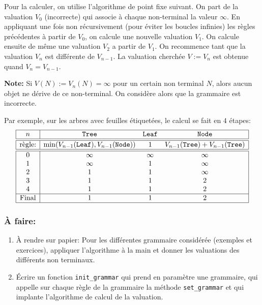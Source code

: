 \documentclass[11pt]{article}
\newcounter{asuivre}
\newenvironment{asks}{\begin{enumerate}\setcounter{enumi}{\theasuivre}}%
                       {\setcounter{asuivre}{\theenumi}\end{enumerate}}
\begin{document}
Pour la calculer, on utilise l'algorithme de point fixe suivant. On part de la
valuation $V_0$ (incorrecte) qui associe à chaque non-terminal la valeur
$\infty$. En appliquant une fois non récursivement (pour éviter les boucles
infinies) les règles précédentes à partir de $V_0$, on calcule une nouvelle
valuation $V_1$.  On calcule ensuite de même une valuation $V_2$ a partir de
$V_1$. On recommence tant que la valuation $V_n$ est différente de
$V_{n-1}$. La valuation cherchée $V := V_n$ est obtenue quand $V_n=V_{n-1}$.
\bigskip

\noindent\textbf{Note:} Si $V(N) := V_n(N) = \infty$ pour un certain non terminal
$N$, alors aucun objet ne dérive de ce non-terminal. On considère alors que la
grammaire est incorrecte.  \bigskip

Par exemple, sur les arbres avec feuilles étiquetées, le calcul se fait en $4$ étapes:
$$\begin{array}{|c|ccc|}
\hline
  n     &  \texttt{Tree}  &  \texttt{Leaf}  &  \texttt{Node} \\
\hline\hline
  \text{règle:} & \min(V_{n-1}(\texttt{Leaf}),V_{n-1}(\texttt{Node}))
               & 1
               & V_{n-1}(\texttt{Tree}) + V_{n-1}(\texttt{Tree}) \\
\hline\hline
  0     &  \infty         &  \infty         &  \infty        \\
  1     &  \infty         &  1              &  \infty        \\
  2     &  1              &  1              &  \infty        \\
  3     &  1              &  1              &  2             \\
  4     &  1              &  1              &  2             \\
\hline
 \text{Final} &  1              &  1              &  2             \\
\hline
\end{array}$$

\subsubsection{À faire:}

\begin{asks}
\item À rendre sur papier: Pour les différentes grammaire considérée (exemples et exercices), appliquer
  l'algorithme à la main et donner les valuations des différents non
  terminaux.
\item Écrire un fonction \texttt{init\_grammar} qui prend en paramètre une
  grammaire, qui appelle sur chaque règle de la grammaire la méthode
  \verb+set_grammar+ et qui implante l'algorithme de calcul de la valuation.
\end{asks}
\end{document}
